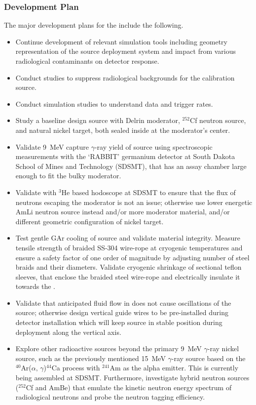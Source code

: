 \subsubsection{Development Plan}
The major development plans for the  include the following.
\begin{itemize}
\item Continue development of relevant simulation tools including geometry representation of the source deployment system and impact from various radiological contaminants on detector response. 
\item Conduct studies to suppress radiological backgrounds for the calibration source.
\item Conduct simulation studies to understand data and trigger rates.
\item Study a baseline design source with Delrin moderator, $^{252}$Cf neutron source, and natural nickel target, both sealed inside at the moderator's center.
\item Validate \SI{9}{\MeV} capture $\gamma$-ray yield of source using spectroscopic measurements with the `RABBIT' germanium detector at South Dakota School of Mines and Technology (SDSMT), that has an assay chamber large enough to fit the bulky moderator. 
\item Validate with $^{3}$He based hodoscope at SDSMT to ensure that the flux of neutrons escaping the moderator is not an issue; otherwise use lower energetic AmLi neutron source instead and/or more moderator material, and/or different geometric configuration of nickel target. 
\item Test gentle GAr cooling of source and validate material integrity. Measure tensile strength of braided SS-304 wire-rope at cryogenic temperatures and ensure a safety factor of one order of magnitude by adjusting number of steel braids and their diameters. Validate cryogenic shrinkage of sectional teflon sleeves, that enclose the braided steel wire-rope and electrically insulate it towards the . 
\item Validate that anticipated fluid flow in  does not cause oscillations of the source; otherwise design vertical guide wires to be pre-installed during detector installation 
which will keep source in stable position during deployment along the vertical axis.
\item Explore other radioactive sources beyond the primary %
\SI{9}{\MeV} $\gamma$-ray nickel source, such as the previously mentioned \SI{15}{\MeV} $\gamma$-ray source based on the  $^{40}$Ar($\alpha,\,\gamma$)$^{44}$Ca process with $^{241}$Am as the alpha emitter. This is currently being assembled at SDSMT.
Furthermore, investigate hybrid neutron sources ($^{252}$Cf and AmBe) that emulate the kinetic neutron energy spectrum of radiological neutrons and probe the neutron tagging efficiency.
\end{itemize}


